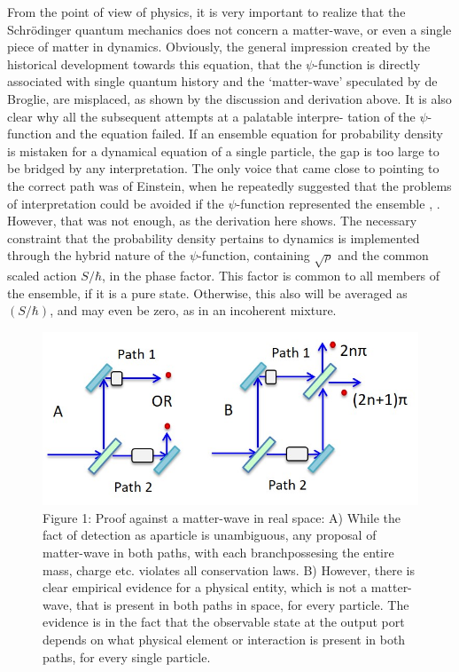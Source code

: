 From the point of view of physics, it is very important to realize that the Schr\"{o}dinger
quantum mechanics does not concern a matter-wave, or even a single piece of matter in
dynamics. Obviously, the general impression created by the historical development towards
this equation, that the $\psi$-function is directly associated with single quantum history and
the `matter-wave' speculated by de Broglie, are misplaced, as shown by the discussion and
derivation above. It is also clear why all the subsequent attempts at a palatable interpre-
tation of the $\psi$-function and the equation failed. If an ensemble equation for probability
density is mistaken for a dynamical equation of a single particle, the gap is too large to be
bridged by any interpretation. The only voice that came close to pointing to the correct path
was of Einstein, when he repeatedly suggested that the problems of interpretation could be
avoided if the $\psi$-function represented the ensemble \cite{chap27-key3}, \cite{chap27-key4}. However, that was not enough, as
the derivation here shows. The necessary constraint that the probability density pertains to
dynamics is implemented through the hybrid nature of the $\psi$-function, containing $\sqrt{\rho}$ and
the common scaled action $S/\hbar$, in the phase factor. This factor is common to all members
of the ensemble, if it is a pure state. Otherwise, this also will be averaged as $(S/\hbar)$, and
may even be zero, as in an incoherent mixture.
\begin{figure}[H]
\captionsetup{singlelinecheck = false, format= hang, justification=raggedright, font=footnotesize, labelsep=space}
\centering
\includegraphics[scale=0.75]{src/images/chap27/1.jpg}
\caption*{Figure 1: Proof against a matter-wave in real space: A) While the fact of detection as a\break particle is
unambiguous, any proposal of matter-wave in both paths, with each branch\break possesing the entire
mass, charge etc. violates all conservation laws. B) However, there is clear empirical evidence for
a physical entity, which is not a matter-wave, that is present in both paths in space, for every
particle. The evidence is in the fact that the observable state at the output port depends on what
physical element or interaction is present in both paths, for every single particle.}
\end{figure}


